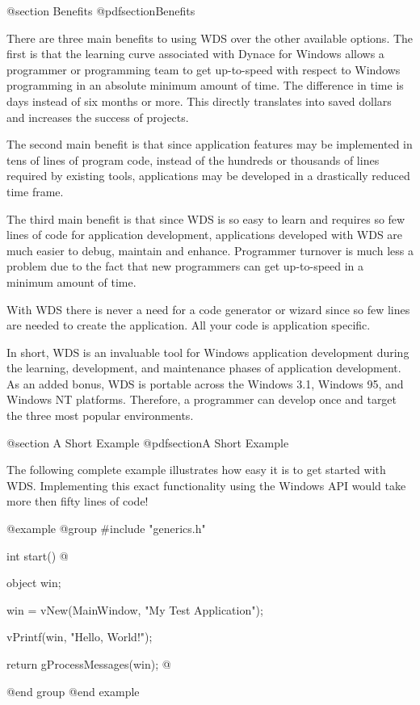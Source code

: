 @section Benefits
@pdfsection{Benefits}

There are three main benefits to using WDS over the other available
options.  The first is that the learning curve associated with Dynace
for Windows allows a programmer or programming team to get up-to-speed
with respect to Windows programming in an absolute minimum amount of
time.  The difference in time is days instead of six months or more.
This directly translates into saved dollars and increases the success of
projects.

The second main benefit is that since application features may be
implemented in tens of lines of program code, instead of the hundreds or
thousands of lines required by existing tools, applications may be
developed in a drastically reduced time frame.

The third main benefit is that since WDS is so easy to learn and
requires so few lines of code for application development, applications
developed with WDS are much easier to debug, maintain and enhance.
Programmer turnover is much less a problem due to the fact that new
programmers can get up-to-speed in a minimum amount of time.

With WDS there is never a need for a code generator or wizard since
so few lines are needed to create the application.  All your code
is application specific.

In short, WDS is an invaluable tool for Windows application development
during the learning, development, and maintenance phases of application
development.  As an added bonus, WDS is portable across the Windows 3.1,
Windows 95, and Windows NT platforms.  Therefore, a programmer can
develop once and target the three most popular environments.

@section A Short Example
@pdfsection{A Short Example}

The following complete example illustrates how easy it is to get started
with WDS.  Implementing this exact functionality using the Windows API
would take more then fifty lines of code!

@example
@group
#include "generics.h"

int     start()
@{
        object  win;

        win = vNew(MainWindow, "My Test Application");

        vPrintf(win, "Hello, World!\n");

        return gProcessMessages(win);
@}
@end group
@end example



